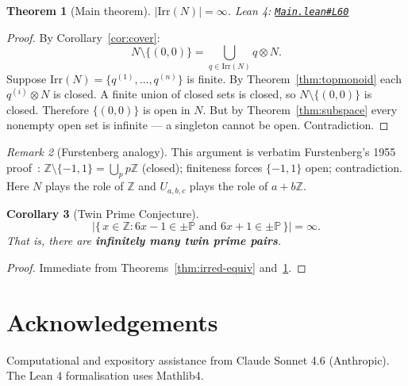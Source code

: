 \documentclass[11pt,a4paper]{amsart}
\theoremstyle{plain}
\newtheorem{theorem}{Theorem}[section]
\newtheorem{corollary}[theorem]{Corollary}
\theoremstyle{definition}
\theoremstyle{remark}
\newtheorem{remark}[theorem]{Remark}
\newcommand{\tens}{\mathbin{\otimes}}       %
\newcommand{\Z}{\mathbb{Z}}
\newcommand{\PP}{\mathbb{P}}               %
\newcommand{\Irr}{\mathrm{Irr}}
\newcommand{\GH}{https://github.com/FruitfulApproach/Lean4TPC/blob/main}
\begin{document}
\begin{mainresult}
\begin{theorem}[Main theorem]
\label{thm:main}
$|\Irr(N)| = \infty$.
\textnormal{Lean 4:} \href{\GH/TPC/Main.lean\#L60}{\texttt{Main.lean\#L60}}
\end{theorem}
\end{mainresult}

\begin{proof}
By Corollary~\ref{cor:cover}:
\[
N \setminus \{(0,0)\} = \bigcup_{q \in \Irr(N)} q \tens N.
\]
Suppose $\Irr(N) = \{q^{(1)}, \ldots, q^{(n)}\}$ is finite.  By
Theorem~\ref{thm:topmonoid} each $q^{(i)} \tens N$ is closed.  A finite
union of closed sets is closed, so $N \setminus \{(0,0)\}$ is closed.
Therefore $\{(0,0)\}$ is open in $N$.  But by Theorem~\ref{thm:subspace}
every nonempty open set is infinite --- a singleton cannot be open.
Contradiction.
\end{proof}

\begin{remark}[Furstenberg analogy]
This argument is verbatim Furstenberg's 1955 proof~\cite{Furstenberg1955}:
$\Z \setminus \{-1,1\} = \bigcup_p p\Z$ (closed); finiteness forces
$\{-1,1\}$ open; contradiction.  Here $N$ plays the role of $\Z$ and
$U_{a,b,c}$ plays the role of $a + b\Z$.
\end{remark}

\begin{mainresult}
\begin{corollary}[Twin Prime Conjecture]
\label{cor:tpc}
\[
\bigl|\{\,x \in \Z : 6x-1 \in \pm\PP \text{ and } 6x+1 \in \pm\PP\,\}\bigr| = \infty.
\]
That is, there are \textbf{infinitely many twin prime pairs}.
\end{corollary}
\end{mainresult}

\begin{proof}
Immediate from Theorems~\ref{thm:irred-equiv} and~\ref{thm:main}.
\end{proof}

\section*{Acknowledgements}

Computational and expository assistance from Claude Sonnet 4.6 (Anthropic).
The Lean 4 formalisation uses Mathlib4.
\end{document}

